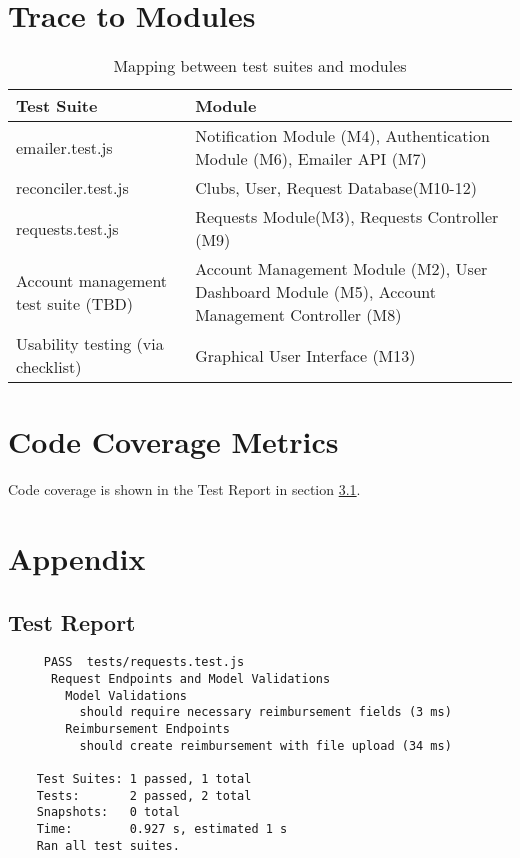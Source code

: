 \documentclass[12pt, titlepage]{article}
\begin{document}
\newpage

\section{Trace to Modules}
\begin{table}[H]
\begin{tabularx}{\textwidth}{p{5cm}p{5cm}}
\toprule {\bf Test Suite} & {\bf Module}\\
\midrule 
emailer.test.js & Notification Module (M4), Authentication Module (M6), Emailer API (M7)\\
reconciler.test.js & Clubs, User, Request Database(M10-12)\\
requests.test.js & Requests Module(M3), Requests Controller (M9)\\
Account management test suite (TBD) & Account Management Module (M2), User Dashboard Module (M5), Account Management Controller (M8)\\
Usability testing (via checklist) & Graphical User Interface (M13)\\
\bottomrule
\end{tabularx}
\caption{Mapping between test suites and modules}
\end{table}

\newpage

\section{Code Coverage Metrics}

Code coverage is shown in the Test Report in section \ref{test_report}.

\section{Appendix}
\subsection{Test Report} \label{test_report}
\begin{small} 
  \begin{verbatim} 
     PASS  tests/requests.test.js
      Request Endpoints and Model Validations
        Model Validations
          should require necessary reimbursement fields (3 ms)
        Reimbursement Endpoints
          should create reimbursement with file upload (34 ms)

    Test Suites: 1 passed, 1 total
    Tests:       2 passed, 2 total
    Snapshots:   0 total
    Time:        0.927 s, estimated 1 s
    Ran all test suites.
  \end{verbatim}
\end{small}
\end{document}

